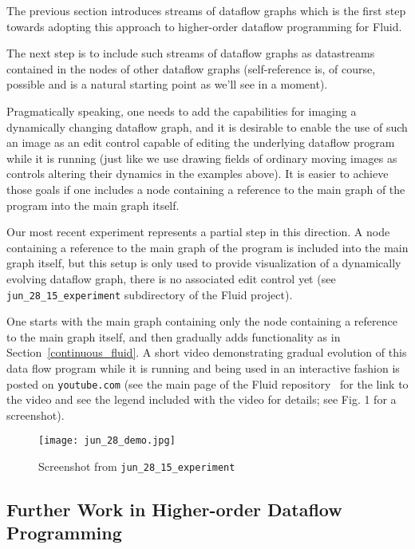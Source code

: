 \documentclass{llncs}
\begin{document}
The previous section introduces streams of dataflow graphs which is the first step towards adopting this approach to higher-order dataflow programming
for Fluid.

The next step is to include such streams of dataflow graphs as datastreams contained in the nodes of other dataflow graphs (self-reference is, of course,
possible and is a natural starting point as we'll see in a moment). 

Pragmatically speaking, one needs to add the capabilities for imaging a dynamically changing dataflow graph, and it is desirable to
enable the use of such an image as an edit control capable of editing the underlying dataflow program while it is running
 (just like we use drawing fields of ordinary moving images as controls altering their dynamics in the examples above). It is
easier to achieve those goals if one includes a node containing a reference to the main graph of the program into the main graph
itself.

Our most recent experiment represents a partial step in this direction. A  node containing a reference to the main graph of the program
is included  into the main graph itself, but this setup is only used to provide visualization of a dynamically evolving dataflow
graph, there is no associated edit control yet  (see {\tt jun\_28\_15\_experiment} subdirectory of the Fluid project).

One starts with the main graph containing only the node containing a reference to the main graph itself, and then
gradually adds functionality as in Section~\ref{continuous_fluid}.
A short video demonstrating gradual evolution of this data flow program while it is running and being used in an interactive
fashion is posted on {\tt youtube.com} (see the main page of the Fluid repository~\cite{Fluid} for the link
to the video and see the legend included with the video for details; see Fig. 1 for a screenshot).

\begin{figure}\label{bukatin_figure}

\centering
\texttt{[image: jun\_28\_demo.jpg]}

\caption{Screenshot from {\tt jun\_28\_15\_experiment} }

\end{figure}

\subsection{Further Work in Higher-order Dataflow Programming}
\end{document}
